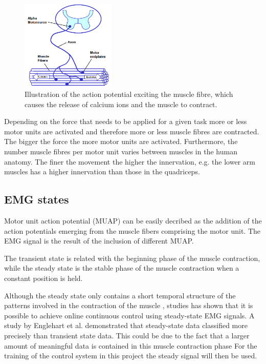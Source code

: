 \begin{figure}[H]
	\includegraphics[width=0.4\textwidth]{figures/Anatomy/EMG_generation}  %
	\caption{Illustration of the action potential exciting the muscle fibre, which causes the release of calcium ions and the muscle to contract. \cite{konrad2005}}
	\label{fig:EMG_generation}  %
\end{figure}

Depending on the force that needs to be applied for a given task more or less motor units are activated and therefore more or less muscle fibres are contracted. The bigger the force the more motor units are activated. Furthermore, the number muscle fibres per motor unit varies between muscles in the human anatomy. The finer the movement the higher the innervation, e.g. the lower arm muscles has a higher innervation than those in the quadriceps. \cite{cram2012}

\subsection{EMG states}
Motor unit action potential (MUAP) can be easily decribed as the addition of the action potentials emerging from the muscle fibers comprising the motor unit. The EMG signal is the result of the inclusion of different MUAP.

 The transient state is related with the beginning phase of the muscle contraction, while the steady state is the stable phase of the muscle contraction when a constant position is held. \cite{mobarak2014}

Although the steady state only contains a short temporal structure of the patterns involved in the contraction of the muscle \cite{mobarak}, studies has shown that it is possible to achieve online continuous control using steady-state EMG signals. A study by Englehart et al. \cite{} demonstrated that steady-state data classified more precisely than transient state data. This could be due to the fact that a larger amount of meaningful data is contained in this muscle contraction phase \cite{mobarak} For the training of the control system  in this project the steady signal will then be used. %

